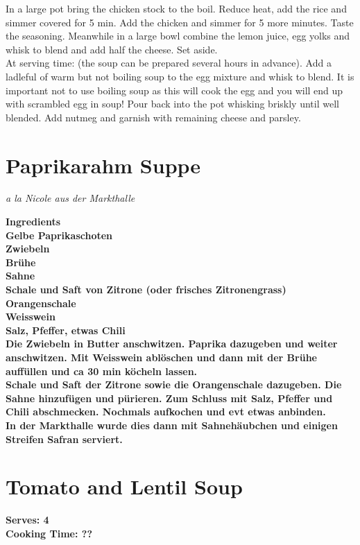 \documentclass[18pt, oneside]{book}
\begin{document}
In a large pot bring the chicken stock to the boil. Reduce heat, add the rice and simmer covered for 5 min. Add the chicken and simmer for 5 more minutes. Taste the seasoning. Meanwhile in a large bowl combine the lemon juice, egg yolks and whisk 
to blend and add half the cheese. Set aside. \\

At serving time: (the soup can be prepared several hours in advance). Add a ladleful of warm but not boiling soup to the egg mixture and whisk to blend. It is important not to use boiling soup as this will cook the egg and you will end up with scrambled egg in soup! Pour back into the pot whisking briskly until well blended. Add 
nutmeg and garnish with remaining cheese and parsley.

\section{Paprikarahm Suppe}
\begin{center}
 \it{a la Nicole aus der Markthalle} \normalfont \\
\end{center}

\bf{Ingredients} \normalfont \\
Gelbe Paprikaschoten \\
Zwiebeln \\ 
Br\"{u}he \\
Sahne \\
Schale und Saft von Zitrone (oder frisches Zitronengrass) \\
Orangenschale \\
Weisswein \\
Salz, Pfeffer, etwas Chili \\

Die Zwiebeln in Butter anschwitzen. Paprika dazugeben und weiter anschwitzen. Mit Weisswein abl\"{o}schen und dann mit der Br\"{u}he auff\"{u}llen und ca 30 min k\"{o}cheln lassen. \\

Schale und Saft der Zitrone sowie die Orangenschale dazugeben. Die Sahne hinzufügen und pürieren. Zum Schluss mit Salz, Pfeffer und Chili abschmecken. Nochmals aufkochen und evt etwas anbinden. \\

In der Markthalle wurde dies dann mit Sahneh\"{a}ubchen und einigen Streifen Safran serviert. 

\section{Tomato and Lentil Soup}
\bf{Serves: 4} \\
\bf{Cooking Time: ??} \\
\end{document}
